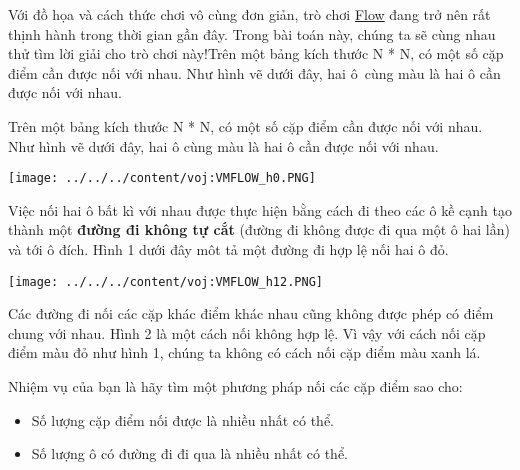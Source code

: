 Với đồ họa và cách thức chơi vô cùng đơn giản, trò chơi \href{https://chrome.google.com/webstore/detail/flow-free/fkkkloddfalabncnhbhmbekpmkgjcgfl}{Flow} đang trở nên rất thịnh hành trong thời gian gần đây. Trong bài toán này, chúng ta sẽ cùng nhau thử tìm lời giải cho trò chơi này!Trên một bảng kích thước N * N, có một số cặp điểm cần được nối với nhau. Như hình vẽ dưới đây, hai ô cùng màu là hai ô cần được nối với nhau.

Trên một bảng kích thước N * N, có một số cặp điểm cần được nối với nhau. Như hình vẽ dưới đây, hai ô cùng màu là hai ô cần được nối với nhau.


\texttt{[image: ../../../content/voj:VMFLOW\_h0.PNG]}

Việc nối hai ô bất kì với nhau được thực hiện bằng cách đi theo các ô kề cạnh tạo thành một \textbf{đường đi không tự cắt} (đường đi không được đi qua một ô hai lần) và tới ô đích. Hình 1 dưới đây môt tả một đường đi hợp lệ nối hai ô đỏ.


\texttt{[image: ../../../content/voj:VMFLOW\_h12.PNG]}

Các đường đi nối các cặp khác điểm khác nhau cũng không được phép có điểm chung với nhau. Hình 2 là một cách nối không hợp lệ. Vì vậy với cách nối cặp điểm màu đỏ như hình 1, chúng ta không có cách nối cặp điểm màu xanh lá.

Nhiệm vụ của bạn là hãy tìm một phương pháp nối các cặp điểm sao cho:
\begin{itemize}
	\item Số lượng cặp điểm nối được là nhiều nhất có thể.
	\item Số lượng ô có đường đi đi qua là nhiều nhất có thể.
\end{itemize}